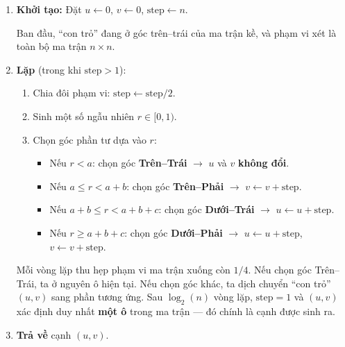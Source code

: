 \documentclass[12pt,a4paper]{article}
\begin{document}
\begin{enumerate}
  \item \textbf{Khởi tạo:} Đặt $u \leftarrow 0$, $v \leftarrow 0$, $\text{step} \leftarrow n$.

  \begin{explain}
  Ban đầu, ``con trỏ'' đang ở góc trên--trái của ma trận kề, và phạm vi xét là toàn bộ ma trận $n \times n$.
  \end{explain}

  \item \textbf{Lặp} (trong khi $\text{step} > 1$):
  \begin{enumerate}[label=\alph*.]
    \item Chia đôi phạm vi: $\text{step} \leftarrow \text{step} / 2$.
    \item Sinh một số ngẫu nhiên $r \in [0, 1)$.
    \item Chọn góc phần tư dựa vào $r$:

    \begin{itemize}
      \item Nếu $r < a$: chọn góc \textbf{Trên--Trái} $\rightarrow$ $u$ và $v$ \textbf{không đổi}.

      \item Nếu $a \leq r < a + b$: chọn góc \textbf{Trên--Phải} $\rightarrow$ $v \leftarrow v + \text{step}$.

      \item Nếu $a + b \leq r < a + b + c$: chọn góc \textbf{Dưới--Trái} $\rightarrow$ $u \leftarrow u + \text{step}$.

      \item Nếu $r \geq a + b + c$: chọn góc \textbf{Dưới--Phải} $\rightarrow$ $u \leftarrow u + \text{step}$, $v \leftarrow v + \text{step}$.
    \end{itemize}
  \end{enumerate}

  \begin{explain}
  Mỗi vòng lặp thu hẹp phạm vi ma trận xuống còn $1/4$. Nếu chọn góc Trên--Trái, ta ở nguyên ô hiện tại. Nếu chọn góc khác, ta dịch chuyển ``con trỏ'' $(u, v)$ sang phần tương ứng. Sau $\log_2(n)$ vòng lặp, $\text{step} = 1$ và $(u, v)$ xác định duy nhất \textbf{một ô} trong ma trận --- đó chính là cạnh được sinh ra.
  \end{explain}

  \item \textbf{Trả về} cạnh $(u, v)$.
\end{enumerate}
\end{document}
